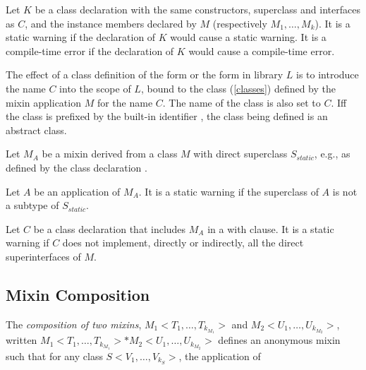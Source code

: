 \documentclass{article}
\begin{document}
\LMHash{}
Let $K$ be a class declaration with the same constructors, superclass and interfaces as $C$, and the instance members declared by $M$ (respectively $M_1, \ldots, M_k$).
It is a static warning if the declaration of $K$ would cause a static warning.
It is a compile-time error if the declaration of $K$ would cause a compile-time error.


\LMHash{}
The effect of a class definition of the form  or the form  in library $L$ is to introduce the name $C$ into the scope of $L$, bound to the class (\ref{classes}) defined by the mixin application $M$ for the name $C$.
The name of the class is also set to $C$.
If{}f the class is prefixed by the built-in identifier \ABSTRACT{}, the class being defined is an abstract class.

\LMHash{}
Let $M_A$ be a mixin derived from a class $M$ with direct superclass $S_{static}$, e.g., as defined by the class declaration .

\LMHash{}
Let $A$ be an application of $M_A$.
It is a static warning if the superclass of $A$ is not a subtype of $S_{static}$.

\LMHash{}
Let $C$ be a class declaration that includes $M_A$ in a with clause.
It is a static warning if $C$ does not implement, directly or indirectly, all the direct superinterfaces of $M$.


\subsection{Mixin Composition}


\LMHash{}
The {\em composition of two mixins}, $M_1<T_1, \ldots, T_{k_{M_1}}>$ and $M_2<U_1, \ldots, U_{k_{M_2}}>$, written $M_1<T_1, \ldots, T_{k_{M_1}}> * M_2<U_1, \ldots, U_{k_{M_2}}>$ defines an anonymous mixin such that for any class $S<V_1, \ldots, V_{k_S}>$, the application of
\end{document}

